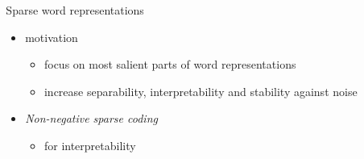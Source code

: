\documentclass{beamer}
\newlength{\sepwid}
\newlength{\onecolwid}
\begin{document}
\newenvironment{table*}%
{\begin{table}}
{\end{table}}

\renewcommand{\caption}[1]{}

\begin{frame}[t]
  \begin{columns}[t] %

    \begin{column}{\sepwid} %
    \end{column}

    \begin{column}{\onecolwid} %

      \begin{block}{Sparse word representations}

        \begin{itemize}
          \item motivation
            \begin{itemize}
              \item focus on most salient parts of word representations \\
                \citep{Faruqui:2015,Berend:2017,Subramanian:2018}

              \item  increase separability, interpretability
                \citep{Olshausen:1997} and stability against noise
            \end{itemize}

          \item \emph{Non-negative sparse coding}
            \begin{itemize}
              \item for interpretability \\
                \citep{Faruqui:2015,Fyshe:2015,Arora:2016} 


\end{itemize}
\end{itemize}
\end{block}
\end{column}
\end{columns}
\end{frame}
\end{document}
